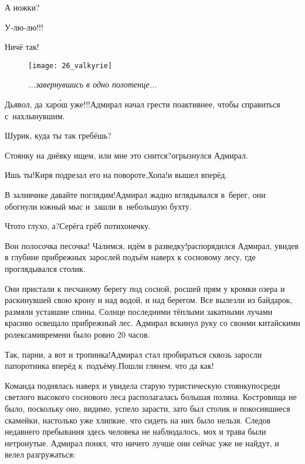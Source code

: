 \diagdash А ножки?

\diagdash У-лю-лю!!!

\diagdash Ничё так!

\begin{wrapfigure}[23]{l}{0.6\textwidth}
	\centering
	\texttt{[image: 26\_valkyrie]}
	\caption{\small\textit{...завернувшись в одно полотенце...}}
\end{wrapfigure}

\diagdash Дьявол, да хар{\'о}ш уже!!!\mdash Адмирал начал грести по\sdash активнее, чтобы справиться с~нахлынувшим.

\diagdash Шурик, куда ты так гребёшь?%

\diagdash Стоянку на днёвку ищем, или мне это снится?\mdash огрызнулся Адмирал.

\diagdash Ишь ты!\mdash Киря подрезал его на повороте,\mdash Хопа!\mdash и вышел вперёд.

\diagdash В заливчике давайте поглядим!\mdash Адмирал жадно вглядывался в~берег, они обогнули южный мыс и~зашли в~небольшую бухту.

\diagdash Что\sdash то глухо, а?\mdash Серёга грёб потихонечку.

\diagdash Вон полосочка песочка! Чалимся, идём в разведку!\mdash распорядился Адмирал, увидев в глубине прибрежных зарослей подъём наверх к сосновому лесу, где проглядывался столик.

Они пристали к песчаному берегу под сосной, росшей прям у кромки озера и раскинувшей свою крону и над водой, и над берегом. Все вылезли из байдарок, размяли уставшие спины. Солнце последними тёплыми закатными лучами красиво освещало прибрежный лес. Адмирал вскинул руку со своими китайскими ролексами\mdash времени было ровно 20 часов.

\diagdash Так, парни, а вот и тропинка!\mdash Адмирал стал пробираться сквозь заросли папоротника вперёд к~подъёму.\mdash Пошли глянем, что да как!

Команда поднялась наверх и увидела старую туристическую стоянку\mdash посреди светлого высокого соснового леса располагалась большая поляна. Костровища не было, поскольку оно, видимо, успело зарасти, зато был столик и покосившиеся скамейки, настолько уже хлипкие, что сидеть на них было нельзя. Следов недавнего пребывания здесь человека не наблюдалось, мох и трава были нетронутые. Адмирал понял, что ничего лучше они сейчас уже не найдут, и велел разгружаться:

